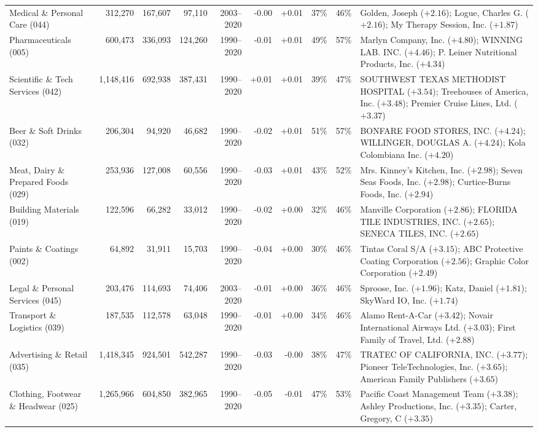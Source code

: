 {\begin{tabular}{l rrrr rr rr >{\raggedright\arraybackslash}p{8.5cm}}
Medical \& Personal Care (044) & 312,270 & 167,607 & 97,110 & 2003--2020 & -0.00 & +0.01 & 37\% & 46\% & Golden, Joseph ($+2.16$); Logue, Charles G. ($+2.16$); My Therapy Session, Inc. ($+1.87$) \\
Pharmaceuticals (005) & 600,473 & 336,093 & 124,260 & 1990--2020 & -0.01 & +0.01 & 49\% & 57\% & Marlyn Company, Inc. ($+4.80$); WINNING LAB. INC. ($+4.46$); P. Leiner Nutritional Products, Inc. ($+4.34$) \\
Scientific \& Tech Services (042) & 1,148,416 & 692,938 & 387,431 & 1990--2020 & +0.01 & +0.01 & 39\% & 47\% & SOUTHWEST TEXAS METHODIST HOSPITAL ($+3.54$); Treehouses of America, Inc. ($+3.48$); Premier Cruise Lines, Ltd. ($+3.37$) \\
Beer \& Soft Drinks (032) & 206,304 & 94,920 & 46,682 & 1990--2020 & -0.02 & +0.01 & 51\% & 57\% & BONFARE FOOD STORES, INC. ($+4.24$); WILLINGER, DOUGLAS A. ($+4.24$); Kola Colombiana Inc. ($+4.20$) \\
Meat, Dairy \& Prepared Foods (029) & 253,936 & 127,008 & 60,556 & 1990--2020 & -0.03 & +0.01 & 43\% & 52\% & Mrs. Kinney's Kitchen, Inc. ($+2.98$); Seven Seas Foods, Inc. ($+2.98$); Curtice-Burns Foods, Inc. ($+2.94$) \\
Building Materials (019) & 122,596 & 66,282 & 33,012 & 1990--2020 & -0.02 & +0.00 & 32\% & 46\% & Manville Corporation ($+2.86$); FLORIDA TILE INDUSTRIES, INC. ($+2.65$); SENECA TILES, INC. ($+2.65$) \\
Paints \& Coatings (002) & 64,892 & 31,911 & 15,703 & 1990--2020 & -0.04 & +0.00 & 30\% & 46\% & Tintas Coral S/A ($+3.15$); ABC Protective Coating Corporation ($+2.56$); Graphic Color Corporation ($+2.49$) \\
Legal \& Personal Services (045) & 203,476 & 114,693 & 74,406 & 2003--2020 & -0.01 & +0.00 & 36\% & 46\% & Sproose, Inc. ($+1.96$); Katz, Daniel ($+1.81$); SkyWard IO, Inc. ($+1.74$) \\
Transport \& Logistics (039) & 187,535 & 112,578 & 63,048 & 1990--2020 & -0.01 & +0.00 & 34\% & 46\% & Alamo Rent-A-Car ($+3.42$); Novair International Airways Ltd. ($+3.03$); First Family of Travel, Ltd. ($+2.88$) \\
Advertising \& Retail (035) & 1,418,345 & 924,501 & 542,287 & 1990--2020 & -0.03 & -0.00 & 38\% & 47\% & TRATEC OF CALIFORNIA, INC. ($+3.77$); Pioneer TeleTechnologies, Inc. ($+3.65$); American Family Publishers ($+3.65$) \\
Clothing, Footwear \& Headwear (025) & 1,265,966 & 604,850 & 382,965 & 1990--2020 & -0.05 & -0.01 & 47\% & 53\% & Pacific Coast Management Team ($+3.38$); Ashley Productions, Inc. ($+3.35$); Carter, Gregory, C ($+3.35$) \\

\end{tabular}}
